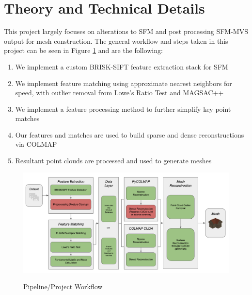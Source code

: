 \documentclass[conference,compsoc]{IEEEtran}
\begin{document}
\section{Theory and Technical Details}
This project largely focuses on alterations to SFM and post processing SFM-MVS 
output for mesh construction. The general workflow and steps taken in this project
can be seen in Figure \ref{fig:pipeline} and are the following:
\begin{enumerate}[1.]
    \item We implement a custom BRISK-SIFT feature extraction stack for SFM
    \item We implement feature matching using approximate nearest neighbors
    for speed, with outlier removal from Lowe's Ratio Test \cite{sift} and MAGSAC++ 
    \cite{magsac}
    \item We implement a feature processing method to further simplify key point 
    matches
    \item Our features and matches are used to build sparse and dense reconstructions
    via COLMAP \cite{colmap}
    \item Resultant point clouds are processed and used to generate meshes
\end{enumerate}
\begin{figure}[ht!]
    \centering
    {{\includegraphics[width=.4\textwidth]{figures/pipeline.png} }}
    \caption{Pipeline/Project Workflow}
    \label{fig:pipeline}
  \end{figure}
\end{document}
